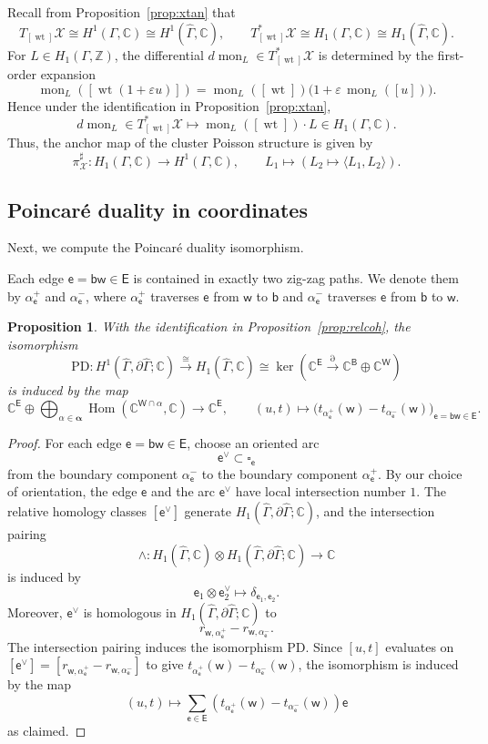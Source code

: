 \documentclass[dvipsnames,11pt]{article}
\newtheorem{proposition}[theorem]{Proposition}
\theoremstyle{definition}
\newcommand{\wt}{\operatorname{wt}}
\newcommand{\Z}{{\mathbb Z}}
\newcommand{\C}{{\mathbb C}}
\def\B{\mathsf B}
\def\W{\mathsf W}
\def\w{\mathsf w}
\def\b{\mathsf b}
\def\e{\mathsf e}
\def\E{\mathsf E}
\def\graph{\Gamma}
\def\zz{\bm \alpha}
\def\mon{\operatorname{mon}}
\def\PD{\mathrm{PD}}
\newcommand{\be}{\begin{equation}}
\newcommand{\ee}{\end{equation}}
\DeclareMathOperator{\Hom}{Hom}
\begin{document}
Recall from Proposition~\ref{prop:xtan} that
\[
T_{[\wt]}\mathcal X \cong H^1(\Gamma,\C)\cong H^1(\widehat\Gamma,\C),
\qquad
T^*_{[\wt]}\mathcal X \cong H_1(\Gamma,\C)\cong H_1(\widehat\Gamma,\C).
\]
For \(L \in H_1(\Gamma,\Z)\), the differential \(d\mon_L\in T^*_{[\wt]}\mathcal X\) is determined by the first-order expansion
\[
\mon_L([\wt(1+\varepsilon u)])
=
\mon_L([\wt])\bigl(1+\varepsilon\,\mon_L([u])\bigr).
\]
Hence under the identification in Proposition~\ref{prop:xtan},
\be \label{eq:diff}
d \mon_L \in T^*_{[\wt]}\mathcal X \mapsto \mon_L([\wt]) \cdot  L \in H_1(\graph,\C).
\ee
Thus, the anchor map of the cluster Poisson structure is given by
\[
\pi^\sharp_{\mathcal X}:H_1(\graph,\C) \rightarrow H^1(\graph,\C), \qquad L_1 \mapsto (L_2 \mapsto \langle L_1,L_2 \rangle ).
\]

\subsection{Poincar\'e duality in coordinates}

Next, we compute the Poincar\'e duality isomorphism.

Each edge \(\e=\b\w\in\E\) is contained in exactly two zig-zag paths. We denote them by \(\alpha_\e^+\) and \(\alpha_\e^-\), where \(\alpha_\e^+\) traverses \(\e\) from \(\w\) to \(\b\) and \(\alpha_\e^-\) traverses \(\e\) from \(\b\) to \(\w\).

\begin{proposition}\label{prop:PDiso}
With the identification in Proposition~\ref{prop:relcoh}, the isomorphism
\[
\PD:H^1(\widehat\Gamma,\partial\widehat\Gamma;\C)\xrightarrow{\cong} H_1(\widehat\Gamma,\C) \cong \ker(\C^\E \xrightarrow[]{\partial} \C^{\B} \oplus \C^\W)
\]
is induced by the map
\[
\C^\E\oplus \bigoplus_{\alpha\in\zz}\Hom(\C^{\W\cap\alpha},\C)
\rightarrow \C^\E,\qquad
(u,t)
\mapsto
\bigl(t_{\alpha_\e^+}(\w)-t_{\alpha_\e^-}(\w)\bigr)_{\e=\b\w\in \E}.
\]
\end{proposition}

\begin{proof}
For each edge \(\e=\b\w\in\E\), choose an oriented arc
\[
\e^\vee\subset \square_\e
\]
from the boundary component \(\alpha_\e^{-}\) to the boundary component \(\alpha_\e^{+}\). By our choice of orientation, the edge \(\e\) and the arc \(\e^\vee\) have local intersection number \(1\). The relative homology classes \([\e^\vee]\) generate \(H_1(\widehat\Gamma,\partial\widehat\Gamma;\C)\), and the intersection pairing
\[
\wedge : H_1(\widehat\Gamma,\C)\otimes H_1(\widehat\Gamma,\partial\widehat\Gamma;\C)\to \C
\]
is induced by
\[
\e_1\otimes \e_2^\vee \mapsto \delta_{\e_1,\e_2}.
\]
Moreover, \(\e^\vee\) is homologous in \(H_1(\widehat\Gamma,\partial\widehat\Gamma;\C)\) to
\[
r_{\w,\alpha_\e^+}-r_{\w,\alpha_\e^-}.
\]
The intersection pairing induces the isomorphism \(\PD\). Since \([u,t]\) evaluates on \([\e^\vee]=[r_{\w,\alpha_\e^+}-r_{\w,\alpha_\e^-}]\) to give \(t_{\alpha_\e^+}(\w)-t_{\alpha_\e^-}(\w)\), the isomorphism is induced by the map
\[
(u,t) \mapsto \sum_{\e \in \E} (t_{\alpha_\e^+}(\w)-t_{\alpha_\e^-}(\w)) \e
\]
as claimed.
\end{proof}
\end{document}
